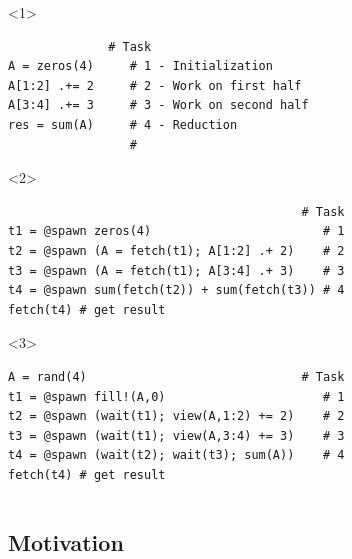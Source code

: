 \documentclass{beamer}
\begin{document}
\begin{frame}[fragile]
\begin{columns}
\begin{example}
\begin{onlyenv}<1>
\begin{verbatim}
              # Task
A = zeros(4)     # 1 - Initialization
A[1:2] .+= 2     # 2 - Work on first half
A[3:4] .+= 3     # 3 - Work on second half
res = sum(A)     # 4 - Reduction
                 #
\end{verbatim}
\end{onlyenv}
\begin{onlyenv}<2>
\begin{verbatim}
                                         # Task
t1 = @spawn zeros(4)                        # 1
t2 = @spawn (A = fetch(t1); A[1:2] .+ 2)    # 2
t3 = @spawn (A = fetch(t1); A[3:4] .+ 3)    # 3
t4 = @spawn sum(fetch(t2)) + sum(fetch(t3)) # 4
fetch(t4) # get result
\end{verbatim}
\end{onlyenv}
\begin{onlyenv}<3>
\begin{verbatim}    
A = rand(4)                              # Task
t1 = @spawn fill!(A,0)                      # 1
t2 = @spawn (wait(t1); view(A,1:2) += 2)    # 2
t3 = @spawn (wait(t1); view(A,3:4) += 3)    # 3
t4 = @spawn (wait(t2); wait(t3); sum(A))    # 4
fetch(t4) # get result
\end{verbatim}
\end{onlyenv}
\end{example}



\end{columns}

\end{frame}

\subsection{Motivation}
\end{document}
